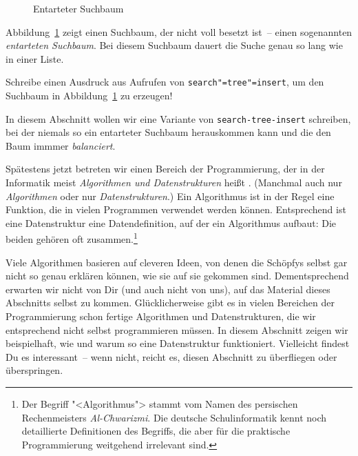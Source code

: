 \begin{figure}[tb]
  \caption{Entarteter Suchbaum}
  \label{fig:degenerated-searchtree}
\end{figure}

Abbildung~\ref{fig:degenerated-searchtree} zeigt einen Suchbaum, der
nicht voll besetzt ist~-- einen sogenannten \textit{entarteten
  Suchbaum}. Bei
diesem Suchbaum dauert die Suche genau so lang wie in einer Liste.
%
\begin{aufgabeinline}
  Schreibe einen Ausdruck aus Aufrufen von
  \texttt{search"=tree"=insert}, um den Suchbaum in
  Abbildung~\ref{fig:degenerated-searchtree} zu erzeugen!
\end{aufgabeinline}
%
In diesem Abschnitt wollen wir eine Variante von
\lstinline{search-tree-insert} schreiben, bei der niemals so ein
entarteter Suchbaum herauskommen kann und die den Baum
immmer \textit{balanciert}.

Spätestens jetzt betreten wir einen Bereich der Programmierung, der in
der Informatik meist \textit{Algorithmen und Datenstrukturen} heißt
\cite{BirdGibbons2020}.
(Manchmal auch nur \textit{Algorithmen} oder nur
\textit{Datenstrukturen}.)  Ein Algorithmus ist in der Regel eine
Funktion, die in vielen Programmen verwendet werden können.
Entsprechend ist eine Datenstruktur eine Datendefinition, auf der ein
Algorithmus aufbaut: Die beiden gehören oft zusammen.\footnote{Der
  Begriff "<Algorithmus"> stammt vom Namen des persischen
  Rechenmeisters \textit{Al-Chwarizmi}.  Die deutsche Schulinformatik
  kennt noch detaillierte Definitionen des Begriffs, die aber für die
  praktische Programmierung weitgehend irrelevant sind.}

Viele Algorithmen basieren auf cleveren Ideen, von denen die
Schöpfys selbst gar nicht so genau erklären können,
wie sie auf sie gekommen sind.  Dementsprechend erwarten wir nicht von
Dir (und auch nicht von uns), auf das Material dieses Abschnitts
selbst zu kommen.  Glücklicherweise gibt es in vielen Bereichen der
Programmierung schon fertige Algorithmen und Datenstrukturen, die wir
entsprechend nicht selbst programmieren müssen.  In diesem
Abschnitt zeigen wir beispielhaft, wie und warum so eine
Datenstruktur funktioniert.  Vielleicht findest Du es interessant~--
wenn nicht, reicht es, diesen Abschnitt zu überfliegen oder
überspringen.

